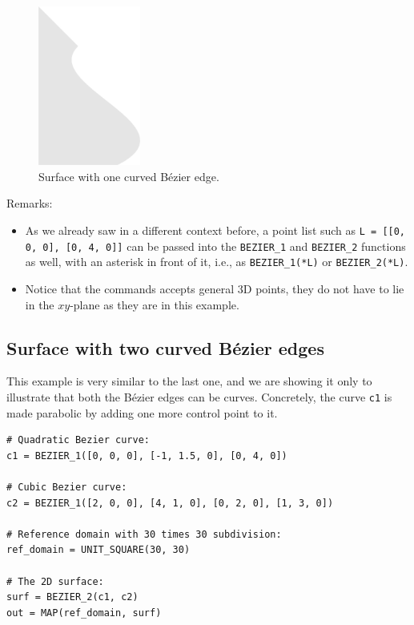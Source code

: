 \begin{figure}[!ht]
\begin{center}
\includegraphics[width=0.3\textwidth]{img/curves-1.png}
\end{center}
\vspace{-4mm}
\caption{Surface with one curved B\'ezier edge.}
\label{fig:curves-1}
\end{figure}

\noindent
Remarks:
\begin{itemize}
\item As we already saw in a different context before, a point list
such as {\tt L = [[0, 0, 0], [0, 4, 0]]} can be passed into 
the {\tt BEZIER\_1} and {\tt BEZIER\_2} functions as well, with 
an asterisk in front of it, i.e., as {\tt BEZIER\_1(*L)} or {\tt BEZIER\_2(*L)}.
\item Notice that the commands accepts general 3D points, they do not have 
to lie in the $xy$-plane as they are in this example.
\end{itemize}

\subsection{Surface with two curved B\'ezier edges}

This example is very similar to the last one, and we are showing it 
only to illustrate that both the B\'ezier edges can be curves. 
Concretely, the curve {\tt c1} is made parabolic by adding one 
more control point to it. \\

\begin{bbox}
\begin{verbatim}
# Quadratic Bezier curve:
c1 = BEZIER_1([0, 0, 0], [-1, 1.5, 0], [0, 4, 0])

# Cubic Bezier curve:
c2 = BEZIER_1([2, 0, 0], [4, 1, 0], [0, 2, 0], [1, 3, 0])

# Reference domain with 30 times 30 subdivision:
ref_domain = UNIT_SQUARE(30, 30)

# The 2D surface:
surf = BEZIER_2(c1, c2)
out = MAP(ref_domain, surf)
\end{verbatim}
\end{bbox}
\vspace{6mm}


